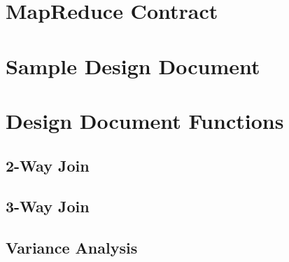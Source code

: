 \section{MapReduce Contract}


\section{Sample Design Document}


\section{Design Document Functions}
\subsection{2-Way Join}


\subsection{3-Way Join}


\subsection{Variance Analysis}
